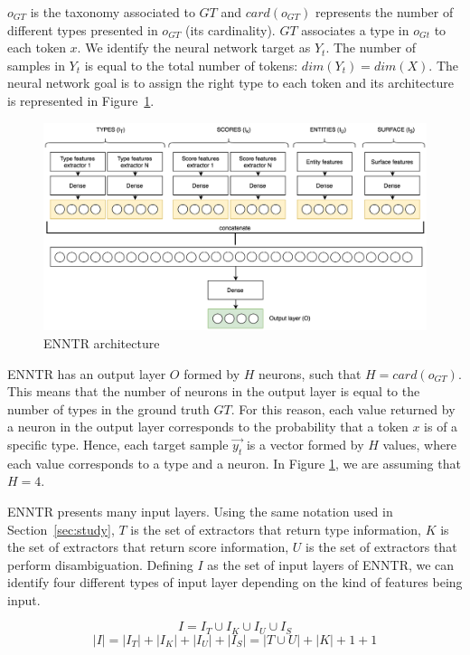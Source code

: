 \documentclass{llncs}
\newcommand{\secref}[1]{\mbox{Section~\ref{#1}}}
\begin{document}
$o_{GT}$ is the taxonomy associated to $GT$ and $card(o_{GT})$ represents the number of different types presented in $o_{GT}$ (its cardinality). $GT$ associates a type in $o_{Gt}$ to each token $x$. We identify the neural network target as $Y_t$. The number of samples in $Y_t$ is equal to the total number of tokens: $dim(Y_t)=dim(X)$. The neural network goal is to assign the right type to each token and its architecture is represented in Figure~\ref{fig:architecture_type_recognition}. 

\begin{figure}
	\centering
    	\includegraphics[scale=0.2]{architecture_type_recognition.png}
 	\caption{ENNTR architecture}
 	\label{fig:architecture_type_recognition}
\end{figure}

ENNTR has an output layer $O$ formed by $H$ neurons, such that $H=card(o_{GT})$. This means that the number of neurons in the output layer is equal to the number of types in the ground truth $GT$. For this reason, each value returned by a neuron in the output layer corresponds to the probability that a token $x$ is of a specific type. Hence, each target sample $\vec{y_t}$ is a vector formed by $H$ values, where each value corresponds to a type and a neuron. In Figure \ref{fig:architecture_type_recognition}, we are assuming that $H = 4$.

ENNTR presents many input layers. Using the same notation used in \secref{sec:study}, $T$ is the set of extractors that return type information, $K$ is the set of extractors that return score information, $U$ is the set of extractors that perform disambiguation. Defining $I$ as the set of input layers of ENNTR, we can identify four different types of input layer depending on the kind of features being input.

$$I = I_T \cup I_K \cup I_U \cup I_S$$
$$\left\vert{I}\right\vert= \left\vert{I_T}\right\vert + \left\vert{I_K}\right\vert + \left\vert{I_U}\right\vert + \left\vert{I_S}\right\vert  = \left\vert{T \cup U}\right\vert + \left\vert{K}\right\vert + 1 + 1$$
\end{document}
